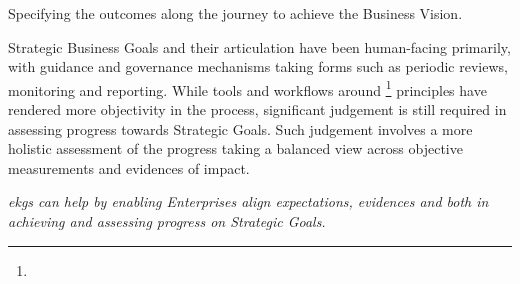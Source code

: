 Specifying the outcomes along the journey to achieve the Business Vision.

Strategic Business Goals and their articulation have been human-facing primarily, with guidance and governance mechanisms
taking forms such as periodic reviews, monitoring and reporting.
While tools and workflows around \footnote{} principles have rendered more objectivity
in the process, significant judgement is still required in assessing progress towards Strategic Goals.
Such judgement involves a more holistic assessment of the progress taking a balanced view across objective measurements
and evidences of impact.

\textit{\Glspl{ekg} can help by enabling Enterprises align expectations, evidences and
 both in achieving and assessing progress on Strategic Goals.}
